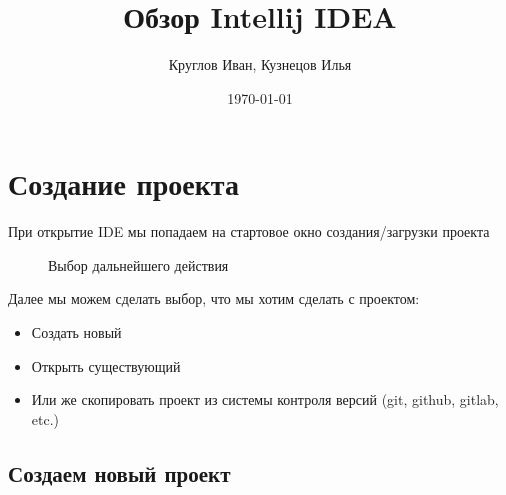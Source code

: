 \documentclass[12pt, a4paper]{article}
\author{Круглов Иван, Кузнецов Илья}
\title{\textbf{Обзор Intellij IDEA}}
\date{\today}
\begin{document}
    \begin{Huge}
        \maketitle
    \end{Huge}

    \newpage
    \tableofcontents

    
    \newpage
    \section{Создание проекта}
    При открытие IDE мы попадаем на стартовое окно создания/загрузки проекта
    
    \begin{figure}[H]
        \caption{Выбор дальнейшего действия}
    \end{figure}

    Далее мы можем сделать выбор, что мы хотим сделать с проектом:
    \begin{itemize}
        \item Создать новый
        \item Открыть существующий
        \item Или же скопировать проект из системы контроля версий (git, github, gitlab, etc.)
    \end{itemize}
    

    \newpage
    \subsection{Создаем новый проект}
\end{document}
